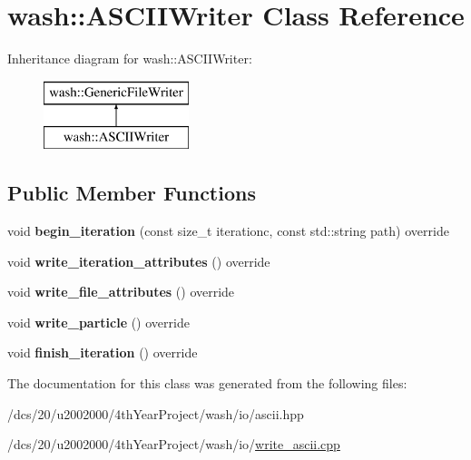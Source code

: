 \hypertarget{classwash_1_1ASCIIWriter}{}\section{wash\+:\+:A\+S\+C\+I\+I\+Writer Class Reference}
\label{classwash_1_1ASCIIWriter}
Inheritance diagram for wash\+:\+:A\+S\+C\+I\+I\+Writer\+:\begin{figure}[H]
\begin{center}
\leavevmode
\includegraphics[height=2.000000cm]{classwash_1_1ASCIIWriter}
\end{center}
\end{figure}
\subsection*{Public Member Functions}
\begin{DoxyCompactItemize}
\item 
\mbox{\label{classwash_1_1ASCIIWriter_ab6594fb85b025fe5ab21114be676a22b}} 
void {\bfseries begin\+\_\+iteration} (const size\+\_\+t iterationc, const std\+::string path) override
\item 
\mbox{\label{classwash_1_1ASCIIWriter_ae0d91c1d0a7af5dfb8d0e36b33b7d3c7}} 
void {\bfseries write\+\_\+iteration\+\_\+attributes} () override
\item 
\mbox{\label{classwash_1_1ASCIIWriter_add2c857439ee812ecb7ccd80459ed15a}} 
void {\bfseries write\+\_\+file\+\_\+attributes} () override
\item 
\mbox{\label{classwash_1_1ASCIIWriter_aaa3c025d6ec340208f804ad045c9b64a}} 
void {\bfseries write\+\_\+particle} () override
\item 
\mbox{\label{classwash_1_1ASCIIWriter_a2614dfedb389b02f2cddfc2792ab769a}} 
void {\bfseries finish\+\_\+iteration} () override
\end{DoxyCompactItemize}


The documentation for this class was generated from the following files\+:\begin{DoxyCompactItemize}
\item 
/dcs/20/u2002000/4th\+Year\+Project/wash/io/ascii.\+hpp\item 
/dcs/20/u2002000/4th\+Year\+Project/wash/io/\mbox{\hyperlink{write__ascii_8cpp}{write\+\_\+ascii.\+cpp}}\end{DoxyCompactItemize}
